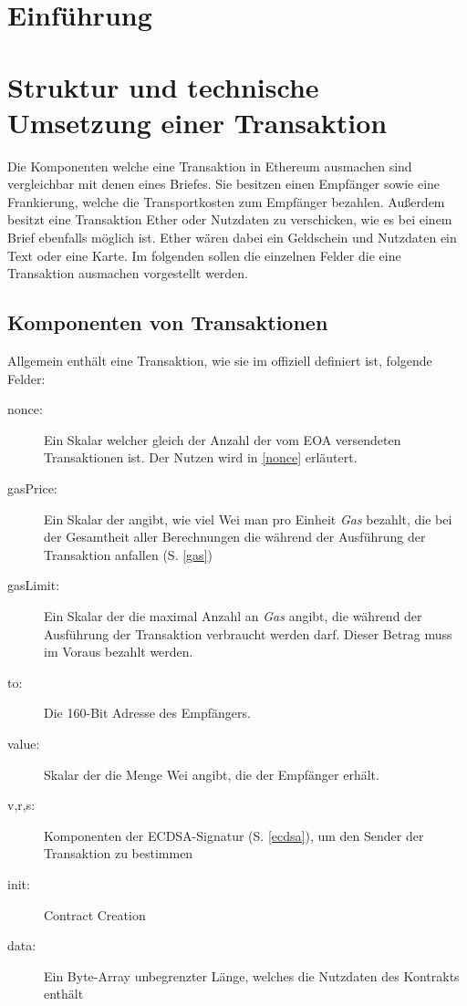 \documentclass[runningheads]{llncs}
\begin{document}
\section{Einführung}
% 

\section{Struktur und technische Umsetzung einer Transaktion}
Die Komponenten welche eine Transaktion in Ethereum ausmachen sind vergleichbar mit denen eines Briefes. Sie besitzen einen Empfänger sowie eine Frankierung, welche die Transportkosten zum Empfänger bezahlen. Außerdem besitzt eine Transaktion Ether oder Nutzdaten zu verschicken, wie es bei einem Brief ebenfalls möglich ist. Ether wären dabei ein Geldschein und Nutzdaten ein Text oder eine Karte. Im folgenden sollen die einzelnen Felder die eine Transaktion ausmachen vorgestellt werden.

\subsection{Komponenten von Transaktionen}
Allgemein enthält eine Transaktion, wie sie im offiziell \cite[S. 4]{wood_ethereum/yellowpaper_2019} definiert ist, folgende Felder:
\begin{description}
  \item[nonce:] Ein Skalar welcher gleich der Anzahl der vom EOA versendeten Transaktionen ist. Der Nutzen wird in \ref{nonce} erläutert.
  \item[gasPrice:] Ein Skalar der angibt, wie viel Wei man pro Einheit \textit{Gas} bezahlt, die bei der Gesamtheit aller Berechnungen die während der Ausführung der Transaktion anfallen (S. \ref{gas})
  \item[gasLimit:] Ein Skalar der die maximal Anzahl an \textit{Gas} angibt, die während der Ausführung der Transaktion verbraucht werden darf. Dieser Betrag muss im Voraus bezahlt werden.
  \item[to:] Die 160-Bit Adresse des Empfängers.
  \item[value:] Skalar der die Menge Wei angibt, die der Empfänger erhält.
  \item[v,r,s:] Komponenten der ECDSA-Signatur (S. \ref{ecdsa}), um den Sender der Transaktion zu bestimmen 
  \item[init:] Contract Creation %
  \item[data:] Ein Byte-Array unbegrenzter Länge, welches die Nutzdaten des Kontrakts enthält  
\end{description}
\end{document}
